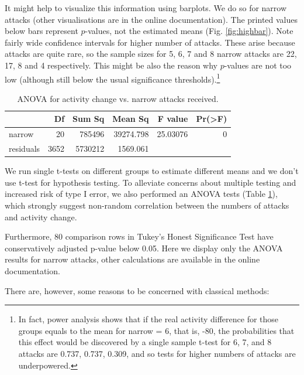 \documentclass[a4paper,fleqn]{cas-dc}
\begin{document}
It might help to visualize this information using barplots. We do so for
narrow attacks (other visualisations are in the online documentation).
The printed values below bars represent \(p\)-values, not the estimated
means (Fig. \ref{fig:highbar}). Note fairly wide confidence intervals
for higher number of attacks. These arise because attacks are quite
rare, so the sample sizes for 5, 6, 7 and 8 narrow attacks are 22, 17, 8
and 4 respectively. This might be also the reason why \(p\)-values are
not too low (although still below the usual significance
thresholds).\footnote{In fact, power analysis shows that if the real activity difference for those groups equals to the mean for \textsf{narrow = 6}, that is, -80, the probabilities that this effect would be discovered by a single sample t-test for 6, 7, and 8 attacks are 0.737, 0.737, 0.309, and so tests for higher numbers of attacks are underpowered.}

\begin{table}[H]\footnotesize
\begin{tabular}{l|r|r|r|r|r}
\hline
  & Df & Sum Sq & Mean Sq & F value & Pr(>F)\\
\hline
narrow & 20 & 785496 & 39274.798 & 25.03076 & 0\\
\hline
residuals & 3652 & 5730212 & 1569.061 &  & \\
\hline
\end{tabular}

\caption{ANOVA for activity change vs. narrow  attacks received.}
\label{tab:anovanarrow}
\end{table}
\normalsize

We run single t-tests on different groups to estimate different means
and we don't use t-test for hypothesis testing. To alleviate concerns
about multiple testing and increased risk of type I error, we also
performed an ANOVA tests (Table \ref{tab:anovanarrow}), which strongly suggest non-random correlation
between the numbers of attacks and activity change.

Furthermore, 80 comparison rows in Tukey's Honest Significance Test
\citep{Tukey1949} have conservatively adjusted p-value below 0.05. Here we
display only the ANOVA results for narrow attacks, other calculations
are available in the online documentation.

There are, however, some reasons to be concerned with classical methods:
\end{document}
